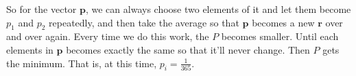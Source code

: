 \documentclass[10.5pt]{article}
\begin{document}
\begin{enumerate}[(a)]
		So for the vector $\boldsymbol{p}$, we can always choose two elements of it and let them become $p_1$ and $p_2$ repeatedly, and then take the average so that $\boldsymbol{p}$ becomes a new $\boldsymbol{r}$ over and over again. 
	Every time we do this work, the $P$ becomes smaller. Until each elements in $\boldsymbol{p}$ becomes exactly the same so that it'll never change. Then $P$ gets the minimum.
	That is, at this time, $p_i = \frac{1}{365}$.
	\end{enumerate}
	
	
\end{document}
